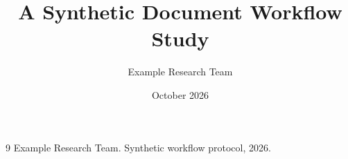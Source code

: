 \documentclass[11pt]{report}
\title{A Synthetic Document Workflow Study}
\author{Example Research Team}
\date{October 2026}
\begin{document}
\maketitle
\tableofcontents


\begin{thebibliography}{9}
 Example Research Team. Synthetic workflow protocol, 2026.
\end{thebibliography}
\end{document}
